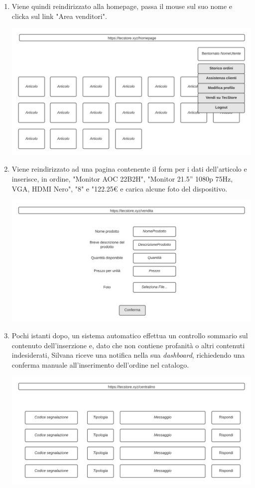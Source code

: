 \documentclass[12pt,a4paper]{article}
\begin{document}
\begin{enumerate}
\newpage

\item Viene quindi reindirizzato alla homepage, passa il mouse sul suo nome e clicka sul link "Area venditori".

\includegraphics[width=\textwidth]{Mockup/homepage_login}

\item Viene reindirizzato ad una pagina contenente il form per i dati dell'articolo e inserisce, in ordine, "Monitor AOC 22B2H", "Monitor 21.5'' 1080p 75Hz, VGA, HDMI Nero", "8" e "122.25€ e carica alcune foto del dispositivo.

\includegraphics[width=\textwidth]{Mockup/vendita}

\newpage
\item Pochi istanti dopo, un sistema automatico effettua un controllo sommario sul contenuto dell'inserzione e, dato che non contiene profanità o altri contenuti indesiderati, Silvana riceve una notifica nella sua \textit{dashboard}, richiedendo una conferma manuale all'inserimento dell'ordine nel catalogo.

\includegraphics[width=\textwidth]{Mockup/centralino}


\end{enumerate}
\end{document}
